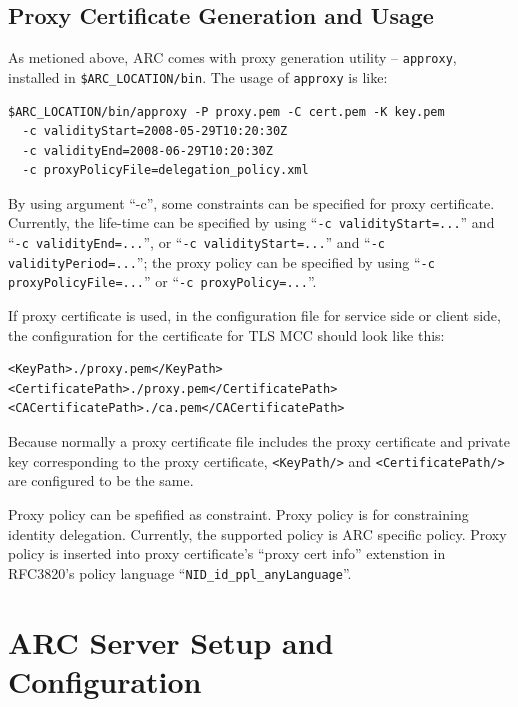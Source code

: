 \documentclass{article}                            %
\begin{document}
\subsection{Proxy Certificate Generation and Usage}
\label{sec:proxy}

As metioned above, ARC comes with proxy generation utility
-- \texttt{approxy}, installed in \verb|$ARC_LOCATION/bin|. The usage
of \texttt{approxy} is like:

\begin{lstlisting}
$ARC_LOCATION/bin/approxy -P proxy.pem -C cert.pem -K key.pem
  -c validityStart=2008-05-29T10:20:30Z
  -c validityEnd=2008-06-29T10:20:30Z
  -c proxyPolicyFile=delegation_policy.xml
\end{lstlisting}

By using argument ``-c'', some constraints can be specified for proxy
certificate. Currently, the life-time can be specified by using ``\texttt{-c
validityStart=...}'' and ``\texttt{-c validityEnd=...}'', or ``\texttt{-c
validityStart=...}'' and ``\texttt{-c validityPeriod=...}''; the proxy policy
can be specified by using ``\texttt{-c proxyPolicyFile=...}'' or ``\texttt{-c
proxyPolicy=...}''.

If proxy certificate is used, in the configuration file for service side or
client side, the configuration for the certificate for TLS MCC should look like
this:

\begin{lstlisting}
<KeyPath>./proxy.pem</KeyPath>
<CertificatePath>./proxy.pem</CertificatePath>
<CACertificatePath>./ca.pem</CACertificatePath>
\end{lstlisting}

Because normally a proxy certificate file includes the proxy certificate and
private key corresponding to the proxy certificate, \texttt{<KeyPath/>} and
\texttt{<CertificatePath/>} are configured to be the same.

Proxy policy can be spefified as constraint. Proxy policy is for constraining
identity delegation. Currently, the supported policy is ARC specific policy.
Proxy policy is inserted into proxy certificate's ``proxy cert info'' extenstion
in RFC3820's policy language ``\verb|NID_id_ppl_anyLanguage|''.


\section{ARC Server Setup and Configuration}
\label{sec:server-setup}
\end{document}
